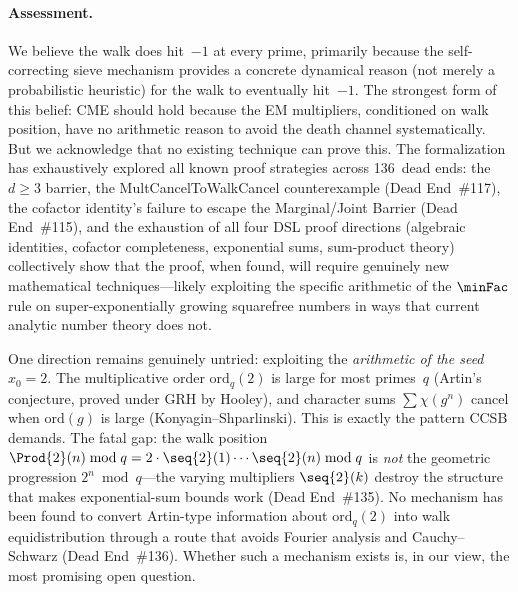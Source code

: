 \paragraph{Assessment.}
We believe the walk does hit~$-1$ at every prime, primarily because
the self-correcting sieve mechanism provides a concrete dynamical
reason (not merely a probabilistic heuristic) for the walk to
eventually hit~$-1$.  The strongest form of this belief: CME should
hold because the EM multipliers, conditioned on walk position, have
no arithmetic reason to avoid the death channel systematically.
But we acknowledge that no existing technique can prove this.
The formalization has exhaustively explored all known proof strategies
across 136~dead ends: the $d \geq 3$ barrier, the MultCancelToWalkCancel
counterexample (Dead End~\#117), the cofactor identity's failure to
escape the Marginal/Joint Barrier (Dead End~\#115), and the exhaustion
of all four DSL proof directions (algebraic identities, cofactor
completeness, exponential sums, sum-product theory) collectively show
that the proof, when found, will require genuinely new mathematical
techniques---likely exploiting the specific arithmetic of the
$\minFac$ rule on super-exponentially growing squarefree numbers in
ways that current analytic number theory does not.

One direction remains genuinely untried: exploiting the
\emph{arithmetic of the seed} $x_0 = 2$.
The multiplicative order $\mathrm{ord}_q(2)$ is large for most
primes~$q$ (Artin's conjecture, proved under GRH by Hooley), and
character sums $\sum \chi(g^n)$ cancel when $\mathrm{ord}(g)$ is
large (Konyagin--Shparlinski).  This is exactly the pattern CCSB
demands.  The fatal gap: the walk position
$\Prod{2}(n) \bmod q = 2 \cdot \seq{2}(1) \cdots \seq{2}(n) \bmod q$
is \emph{not} the geometric progression $2^n \bmod q$---the
varying multipliers $\seq{2}(k)$ destroy the structure that makes
exponential-sum bounds work (Dead End~\#135).  No mechanism has been
found to convert Artin-type information about $\mathrm{ord}_q(2)$
into walk equidistribution through a route that avoids Fourier
analysis and Cauchy--Schwarz (Dead End~\#136).  Whether such a
mechanism exists is, in our view, the most promising open question.
